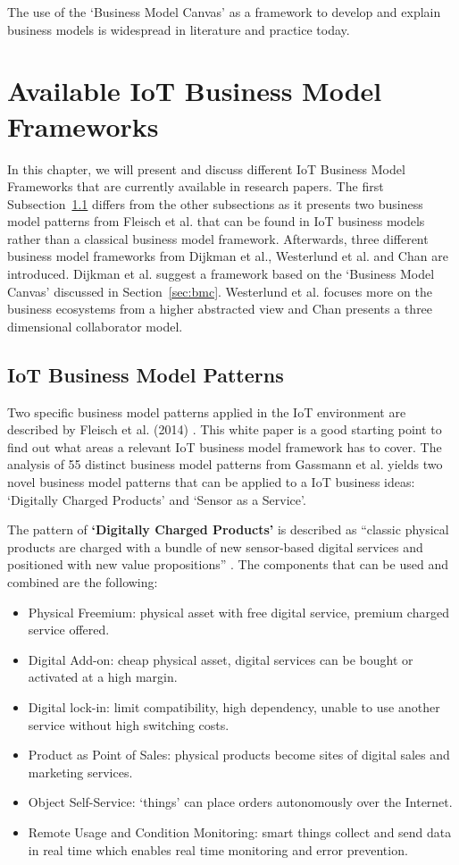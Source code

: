 		The use of the `Business Model Canvas' as a framework to develop and explain business models is widespread in literature and practice today.

\section{Available IoT Business Model Frameworks}
\label{sec:bmf_available}
	In this chapter, we will present and discuss different IoT Business Model Frameworks that are currently available in research papers. The first Subsection~\ref{subsec:fleisch} differs from the other subsections as it presents two business model patterns from Fleisch et al. that can be found in IoT business models rather than a classical business model framework. Afterwards, three different business model frameworks from Dijkman et al., Westerlund et al. and Chan are introduced. Dijkman et al. suggest a framework based on the `Business Model Canvas' discussed in Section~\ref{sec:bmc}. Westerlund et al. focuses more on the business ecosystems from a higher abstracted view and Chan presents a three dimensional collaborator model.

	\subsection{IoT Business Model Patterns}
	\label{subsec:fleisch}
		Two specific business model patterns applied in the IoT environment are described by Fleisch et al. (2014) \cite{fleisch}. This white paper is a good starting point to find out what areas a relevant IoT business model framework has to cover. The analysis of 55 distinct business model patterns from Gassmann et al. \cite{gassmann55} yields two novel business model patterns that can be applied to a IoT business ideas: `Digitally Charged Products' and `Sensor as a Service'.

		The pattern of \textbf{`Digitally Charged Products'} is described as ``classic physical products are charged with a bundle of new sensor-based digital services and positioned with new value propositions'' \cite[p.~10]{fleisch}. The components that can be used and combined are the following:

		\begin{itemize}
			\item Physical Freemium: physical asset with free digital service, premium charged service offered.
			\item Digital Add-on: cheap physical asset, digital services can be bought or activated at a high margin.
			\item Digital lock-in: limit compatibility, high dependency, unable to use another service without high switching costs.
			\item Product as Point of Sales: physical products become  sites of digital sales and marketing services.
			\item Object Self-Service: `things' can place orders autonomously over the Internet. 
			\item Remote Usage and Condition Monitoring: smart things collect and send data in real time which enables real time monitoring and error prevention.
		\end{itemize}

